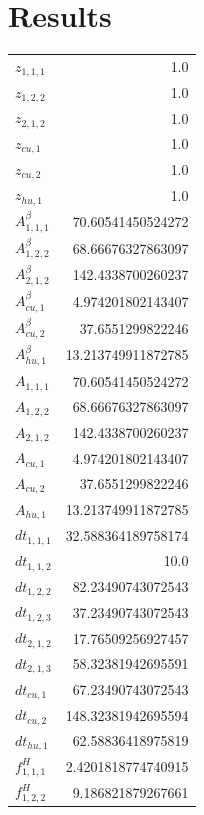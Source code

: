 \documentclass{article}%
\makeatletter
\let\mcnewpage=\newpage%
\newcommand{\TrickSupertabularIntoMulticols}{%
\renewcommand\newpage{%
\if@firstcolumn%
\hrule width\linewidth height0pt%
\columnbreak%
\else%
\mcnewpage%
\fi%
}%
}%
\makeatother
\begin{document}
\section{Results}%
\thispagestyle{plain}%
\begin{multicols*}{3}%
\TrickSupertabularIntoMulticols%
%
\begin{supertabular}{lr}%
	$z_{1,1,1}$ & 1.0 \\%
	$z_{1,2,2}$ & 1.0 \\%
	$z_{2,1,2}$ & 1.0 \\%
	$z_{cu,1}$ & 1.0 \\%
	$z_{cu,2}$ & 1.0 \\%
	$z_{hu,1}$ & 1.0 \\%
	$A_{1,1,1}^{\beta}$ & 70.60541450524272 \\%
	$A_{1,2,2}^{\beta}$ & 68.66676327863097 \\%
	$A_{2,1,2}^{\beta}$ & 142.4338700260237 \\%
	$A_{cu,1}^{\beta}$ & 4.974201802143407 \\%
	$A_{cu,2}^{\beta}$ & 37.6551299822246 \\%
	$A_{hu,1}^{\beta}$ & 13.213749911872785 \\%
	$A_{1,1,1}$ & 70.60541450524272 \\%
	$A_{1,2,2}$ & 68.66676327863097 \\%
	$A_{2,1,2}$ & 142.4338700260237 \\%
	$A_{cu,1}$ & 4.974201802143407 \\%
	$A_{cu,2}$ & 37.6551299822246 \\%
	$A_{hu,1}$ & 13.213749911872785 \\%
	$dt_{1,1,1}$ & 32.588364189758174 \\%
	$dt_{1,1,2}$ & 10.0 \\%
	$dt_{1,2,2}$ & 82.23490743072543 \\%
	$dt_{1,2,3}$ & 37.23490743072543 \\%
	$dt_{2,1,2}$ & 17.76509256927457 \\%
	$dt_{2,1,3}$ & 58.32381942695591 \\%
	$dt_{cu,1}$ & 67.23490743072543 \\%
	$dt_{cu,2}$ & 148.32381942695594 \\%
	$dt_{hu,1}$ & 62.58836418975819 \\%
	$f_{1,1,1}^{H}$ & 2.4201818774740915 \\%
	$f_{1,2,2}^{H}$ & 9.186821879267661 \\%

\end{supertabular}
\end{multicols*}
\end{document}
